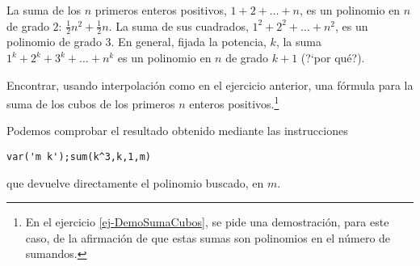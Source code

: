 \begin{ejer}\label{ej-SumaCubos}
La suma de los $n$ primeros enteros positivos, $1+2+\dots+n$, es un polinomio en
$n$
de grado
$2$: $\frac12n^2+\frac12n$. La suma de sus cuadrados, $1^2+2^2+\dots+n^2$, es un
polinomio de grado $3$. En general, fijada la potencia, $k$, la suma
$1^k+2^k+3^k+\dots+n^k$ es un polinomio en $n$ de grado $k+1$ ({\sc ?`por
qu\'e?}).

Encontrar, usando interpolaci\'on como en el ejercicio anterior,   una fórmula
para la suma de los cubos de los primeros $n$ enteros
positivos.\footnote{En el ejercicio \ref{ej-DemoSumaCubos}, se pide
una demostración, para este caso, de la afirmaci\'on de que estas sumas son
polinomios en
el n\'umero de sumandos.}

Podemos comprobar el resultado obtenido mediante las instrucciones
\begin{center}
\lstinline|var('m k');sum(k^3,k,1,m)| 
\end{center}
que devuelve directamente el polinomio
buscado, en $m$.
\end{ejer}

\begin{comment}
\begin{ejer}
Escribir, en las bases estándar, la matriz de la aplicación lineal 
$F:\mathbb{Q}^3\longrightarrow \mathbb{Q}^2$ que tiene como n\'ucleo el plano
$\{x+y-2z=0\}$ y
tal que
$F(1,-1,1)=(-1,1)$.
\end{ejer}

\pagebreak[3]

\begin{ejer}
 Consideremos en $\mathbb{Q}^4$ los  subespacios vectoriales
\[W_1=<(2,1,1,0),\,(1,0,2,-1)>\] y   $W_2$ soluci\'on del sistema de ecuaciones
\[
\begin{aligned}
2x-z&=0\\
x+y-z-t&=0.
\end{aligned}
\]



Se pide calcular:
\begin{itemize}
\item las ecuaciones de $W_1$;
\item una base de $W_2$;
\item las dimensiones de $W_1\cap W_2$ y de $W_1+W_2$.
\end{itemize}
\emph{Sugerencia: } averiguar, para una matriz dada, el uso del m\'etodo
\lstinline|.right_kernel()|.
\end{ejer}
\end{comment}

